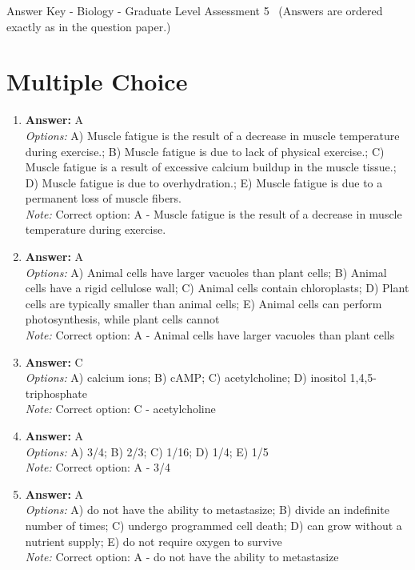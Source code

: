 \documentclass[12pt]{article}
\begin{document}
\begin{center}
Answer Key - Biology - Graduate Level Assessment 5 \
\small (Answers are ordered exactly as in the question paper.)
\end{center}

\section*{Multiple Choice}
\begin{enumerate}[label=\arabic*.]
\item \textbf{Answer:} A
\\ \textit{Options:} A) Muscle fatigue is the result of a decrease in muscle temperature during exercise.; B) Muscle fatigue is due to lack of physical exercise.; C) Muscle fatigue is a result of excessive calcium buildup in the muscle tissue.; D) Muscle fatigue is due to overhydration.; E) Muscle fatigue is due to a permanent loss of muscle fibers.
\\ \textit{Note:} Correct option: A - Muscle fatigue is the result of a decrease in muscle temperature during exercise.
\item \textbf{Answer:} A
\\ \textit{Options:} A) Animal cells have larger vacuoles than plant cells; B) Animal cells have a rigid cellulose wall; C) Animal cells contain chloroplasts; D) Plant cells are typically smaller than animal cells; E) Animal cells can perform photosynthesis, while plant cells cannot
\\ \textit{Note:} Correct option: A - Animal cells have larger vacuoles than plant cells
\item \textbf{Answer:} C
\\ \textit{Options:} A) calcium ions; B) cAMP; C) acetylcholine; D) inositol 1,4,5-triphosphate
\\ \textit{Note:} Correct option: C - acetylcholine
\item \textbf{Answer:} A
\\ \textit{Options:} A) 3/4; B) 2/3; C) 1/16; D) 1/4; E) 1/5
\\ \textit{Note:} Correct option: A - 3/4
\item \textbf{Answer:} A
\\ \textit{Options:} A) do not have the ability to metastasize; B) divide an indefinite number of times; C) undergo programmed cell death; D) can grow without a nutrient supply; E) do not require oxygen to survive
\\ \textit{Note:} Correct option: A - do not have the ability to metastasize
\end{enumerate}
\end{document}
